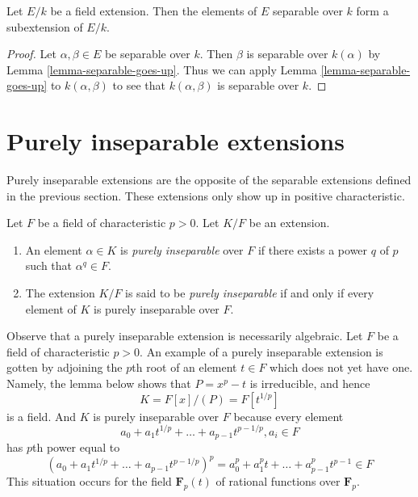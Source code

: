\begin{lemma}
\label{lemma-separable-elements}
Let $E/k$ be a field extension. Then the elements of $E$ separable
over $k$ form a subextension of $E/k$.
\end{lemma}

\begin{proof}
Let $\alpha, \beta \in E$ be separable over $k$. Then $\beta$ is separable
over $k(\alpha)$ by Lemma \ref{lemma-separable-goes-up}.
Thus we can apply Lemma \ref{lemma-separable-goes-up} to $k(\alpha, \beta)$
to see that $k(\alpha, \beta)$ is separable over $k$.
\end{proof}






\section{Purely inseparable extensions}
\label{section-purely-inseparable}

\noindent
Purely inseparable extensions are the opposite of the separable
extensions defined in the previous section. These extensions only
show up in positive characteristic.

\begin{definition}
\label{definition-purely-inseparable}
Let $F$ be a field of characteristic $p > 0$. Let $K/F$ be an extension.
\begin{enumerate}
\item An element $\alpha \in K$ is {\it purely inseparable} over $F$
if there exists a power $q$ of $p$ such that $\alpha^q \in F$.
\item The extension $K/F$ is said to be {\it purely inseparable}
if and only if every element of $K$ is purely inseparable over $F$.
\end{enumerate}
\end{definition}

\noindent
Observe that a purely inseparable extension is necessarily algebraic.
Let $F$ be a field of characteristic $p > 0$.
An example of a purely inseparable extension is gotten by adjoining
the $p$th root of an element $t \in F$ which does not yet have one. Namely,
the lemma below shows that $P = x^p - t$ is irreducible, and hence
$$
K = F[x]/(P) = F[t^{1/p}]
$$
is a field. And $K$ is purely inseparable over $F$ because every element
$$
a_0 + a_1t^{1/p} + \ldots + a_{p - 1}t^{p - 1/p}, a_i \in F
$$
has $p$th power equal to
$$
(a_0 + a_1t^{1/p} + \ldots + a_{p - 1}t^{p - 1/p})^p =
a_0^p + a_1^p t + \ldots + a_{p - 1}^pt^{p - 1} \in F
$$
This situation occurs for the field
$\mathbf{F}_p(t)$ of rational functions over $\mathbf{F}_p$.

